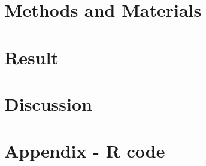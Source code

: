 \documentclass[11pt]{article}
\begin{document}
\section{Methods and Materials}\label{methods}



\section{Result}\label{result}


\section{Discussion}\label{discussion}



\begin{thebibliography}{9}

\end{thebibliography}

\section*{Appendix - R code}\label{appendix}
\end{document}
